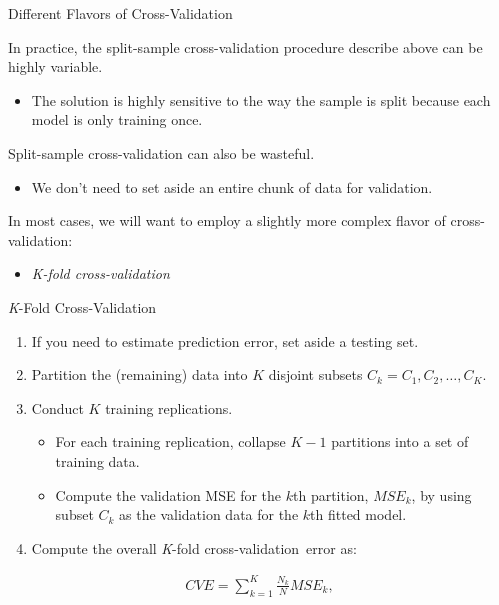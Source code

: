 \documentclass{beamer}\usepackage[]{graphicx}\usepackage[]{color}
\newcommand{\kfold}[0]{\emph{K}-fold cross-validation}
\begin{document}
\begin{frame}{Different Flavors of Cross-Validation}
  
  In practice, the split-sample cross-validation procedure describe above can be 
  highly variable.
  \vc
  \begin{itemize}
  \item The solution is highly sensitive to the way the sample is split because 
    each model is only training once.
  \end{itemize}
  \vb 
  Split-sample cross-validation can also be wasteful.
  \vc
  \begin{itemize}
  \item We don't need to set aside an entire chunk of data for validation.
  \end{itemize}
  \vb 
  In most cases, we will want to employ a slightly more complex flavor of
  cross-validation: 
  \vc
  \begin{itemize}
  \item \emph{K-fold cross-validation}
  \end{itemize}
  
\end{frame}


\begin{frame}{\emph{K}-Fold Cross-Validation}
  
  \begin{enumerate}
  \item If you need to estimate prediction error, set aside a testing set.
    \vb
  \item Partition the (remaining) data into $K$ disjoint subsets $C_k = C_1, C_2, 
    \ldots, C_K$.  
    \vb
  \item Conduct $K$ training replications. 
    \vb
    \begin{itemize}
    \item For each training replication, collapse $K - 1$ partitions into 
      a set of training data. 
      \vb
    \item Compute the validation MSE for the $k$th partition, $MSE_k$, by using
      subset $C_k$ as the validation data for the $k$th fitted model.
    \end{itemize}
    \vb
  \item Compute the overall \kfold~error as:
  \end{enumerate}
  \begin{align*}
    CVE = \sum_{k = 1}^K \frac{N_k}{N}MSE_k,
  \end{align*}
  
\end{frame}
\end{document}
